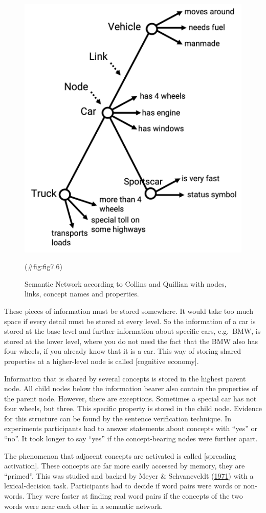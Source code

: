 \documentclass[
]{krantz}
\begin{document}
\begin{figure}

{\centering \includegraphics[width=0.6\linewidth]{images/ch7/fig5} 

}

\caption{Semantic Network according to Collins and Quillian with nodes, links, concept names and properties. }(\#fig:fig7.6)
\end{figure}

These pieces of information must be stored somewhere. It would take too much space if every detail must be stored at every level. So the information of a car is stored at the base level and further information about specific cars, e.g.~BMW, is stored at the lower level, where you do not need the fact that the BMW also has four wheels, if you already know that it is a car. This way of storing shared properties at a higher-level node is called {[}cognitive economy{]}.

Information that is shared by several concepts is stored in the highest parent node. All child nodes below the information bearer also contain the properties of the parent node. However, there are exceptions. Sometimes a special car has not four wheels, but three. This specific property is stored in the child node. Evidence for this structure can be found by the sentence verification technique. In experiments participants had to answer statements about concepts with ``yes'' or ``no''. It took longer to say ``yes'' if the concept-bearing nodes were further apart.

The phenomenon that adjacent concepts are activated is called {[}spreading activation{]}. These concepts are far more easily accessed by memory, they are ``primed''. This was studied and backed by Meyer \& Schvaneveldt (\protect\hyperlink{ref-meyer1971facilitation}{1971}) with a lexical-decision task. Participants had to decide if word pairs were words or non-words. They were faster at finding real word pairs if the concepts of the two words were near each other in a semantic network.
\end{document}
